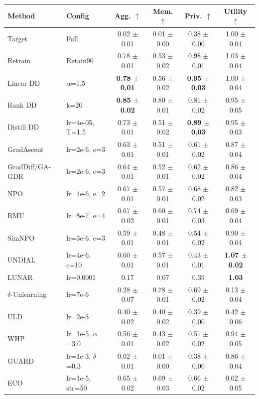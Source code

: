 \begin{tabular}{llcccc}
\toprule
Method & Config & Agg. $\uparrow$ & Mem. $\uparrow$ & Priv. $\uparrow$ & Utility $\uparrow$ \\
\midrule
Target & Full & 0.02 $\pm$ 0.01 & 0.01 $\pm$ 0.00 & 0.38 $\pm$ 0.00 & 1.00 $\pm$ 0.04 \\
Retrain & Retain90 & 0.78 $\pm$ 0.01 & 0.53 $\pm$ 0.02 & 0.98 $\pm$ 0.01 & 1.03 $\pm$ 0.04 \\
\midrule
Linear DD & $\alpha$=1.5 & \textbf{0.78 $\pm$ 0.01} & 0.56 $\pm$ 0.02 & \textbf{0.95 $\pm$ 0.03} & 1.00 $\pm$ 0.04 \\
Rank DD & k=20 & \textbf{0.85 $\pm$ 0.02} & 0.80 $\pm$ 0.01 & 0.81 $\pm$ 0.02 & 0.95 $\pm$ 0.05 \\
Distill DD & lr=4e-05, T=1.5 & 0.73 $\pm$ 0.01 & 0.51 $\pm$ 0.02 & \textbf{0.89 $\pm$ 0.03} & 0.95 $\pm$ 0.03 \\
GradAscent & lr=2e-6, e=3 & 0.63 $\pm$ 0.01 & 0.51 $\pm$ 0.01 & 0.61 $\pm$ 0.02 & 0.87 $\pm$ 0.04 \\
GradDiff/GA-GDR & lr=2e-6, e=3 & 0.64 $\pm$ 0.01 & 0.52 $\pm$ 0.01 & 0.62 $\pm$ 0.02 & 0.86 $\pm$ 0.04 \\
NPO & lr=4e-6, e=2 & 0.67 $\pm$ 0.01 & 0.57 $\pm$ 0.01 & 0.68 $\pm$ 0.02 & 0.82 $\pm$ 0.03 \\
RMU & lr=8e-7, e=4 & 0.67 $\pm$ 0.02 & 0.60 $\pm$ 0.01 & 0.74 $\pm$ 0.03 & 0.69 $\pm$ 0.04 \\
SimNPO & lr=3e-6, e=3 & 0.59 $\pm$ 0.01 & 0.48 $\pm$ 0.01 & 0.54 $\pm$ 0.02 & 0.90 $\pm$ 0.04 \\
UNDIAL & lr=4e-6, e=10 & 0.60 $\pm$ 0.01 & 0.57 $\pm$ 0.01 & 0.43 $\pm$ 0.01 & \textbf{1.07 $\pm$ 0.02} \\
LUNAR & lr=0.0001 & 0.17 & 0.07 & 0.39 & \textbf{1.03} \\
$\delta$-Unlearning & lr=7e-6 & 0.28 $\pm$ 0.07 & 0.78 $\pm$ 0.01 & 0.69 $\pm$ 0.02 & 0.13 $\pm$ 0.04 \\
ULD & lr=2e-3 & 0.40 $\pm$ 0.02 & 0.40 $\pm$ 0.02 & 0.39 $\pm$ 0.00 & 0.42 $\pm$ 0.06 \\
WHP & lr=1e-5, $\alpha$=3.0 & 0.56 $\pm$ 0.01 & 0.43 $\pm$ 0.02 & 0.51 $\pm$ 0.02 & 0.94 $\pm$ 0.05 \\
GUARD & lr=1e-3, $\delta$=0.3 & 0.02 $\pm$ 0.01 & 0.01 $\pm$ 0.00 & 0.38 $\pm$ 0.00 & 0.86 $\pm$ 0.04 \\
ECO & lr=1e-5, str=50 & 0.65 $\pm$ 0.02 & 0.69 $\pm$ 0.03 & 0.66 $\pm$ 0.02 & 0.62 $\pm$ 0.05 \\
\bottomrule
\end{tabular}

